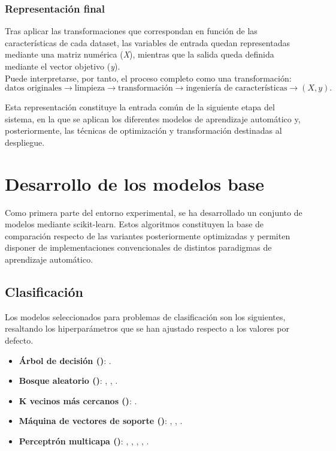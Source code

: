 \documentclass[a4paper,12pt,twoside,final]{book}
\begin{document}
\subsubsection{Representación final}
Tras aplicar las transformaciones que correspondan en función de las características de cada dataset, las variables de
entrada quedan representadas mediante una matriz numérica (\textit{X}), mientras que la salida queda definida mediante
el vector objetivo (\textit{y}).\\

Puede interpretarse, por tanto, el proceso completo como una transformación:
\[
\text{datos originales}
\rightarrow
\text{limpieza}
\rightarrow
\text{transformación}
\rightarrow
\text{ingeniería de características}
\rightarrow
(X,y).
\]

Esta representación constituye la entrada común de la siguiente etapa del sistema, en la que se aplican los diferentes
modelos de aprendizaje automático y, posteriormente, las técnicas de optimización y transformación destinadas al
despliegue.

\section{Desarrollo de los modelos base}
Como primera parte del entorno experimental, se ha desarrollado un conjunto de modelos mediante scikit-learn. Estos
algoritmos constituyen la base de comparación respecto de las variantes posteriormente optimizadas y permiten disponer
de implementaciones convencionales de distintos paradigmas de aprendizaje automático.

\subsection{Clasificación}
Los modelos seleccionados para problemas de clasificación son los siguientes, resaltando los hiperparámetros que se han
ajustado respecto a los valores por defecto.
\begin{itemize}
  \item \textbf{Árbol de decisión ()}: .
  \item \textbf{Bosque aleatorio ()}: , ,
  .
  \item \textbf{K vecinos más cercanos ()}: .
  \item \textbf{Máquina de vectores de soporte ()}: , ,
  .
  \item \textbf{Perceptrón multicapa ()}: ,
  , , , .
\end{itemize}
\end{document}
